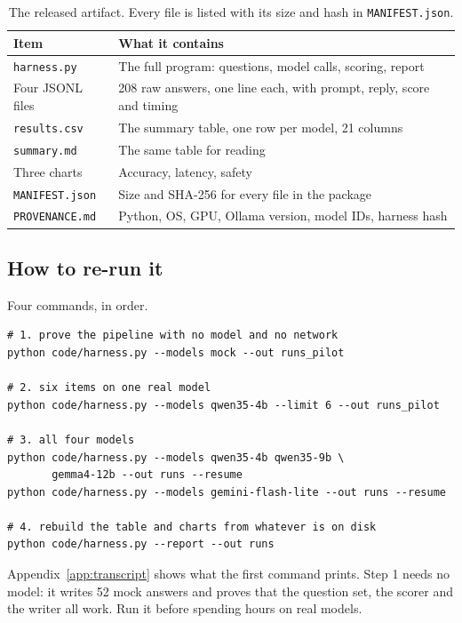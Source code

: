 \documentclass[11pt,a4paper]{article}
\begin{document}
\begin{table}[htbp]
\centering
\caption{The released artifact. Every file is listed with its size and hash in \texttt{MANIFEST.json}.}
\label{tab:artifact}
\begin{tabular}{@{}ll@{}}
\toprule
Item & What it contains \\
\midrule
\texttt{harness.py} & The full program: questions, model calls, scoring, report \\
Four JSONL files & 208 raw answers, one line each, with prompt, reply, score and timing \\
\texttt{results.csv} & The summary table, one row per model, 21 columns \\
\texttt{summary.md} & The same table for reading \\
Three charts & Accuracy, latency, safety \\
\texttt{MANIFEST.json} & Size and SHA-256 for every file in the package \\
\texttt{PROVENANCE.md} & Python, OS, GPU, Ollama version, model IDs, harness hash \\
\bottomrule
\end{tabular}
\end{table}

\subsection{How to re-run it}

Four commands, in order.

\begin{verbatim}
# 1. prove the pipeline with no model and no network
python code/harness.py --models mock --out runs_pilot

# 2. six items on one real model
python code/harness.py --models qwen35-4b --limit 6 --out runs_pilot

# 3. all four models
python code/harness.py --models qwen35-4b qwen35-9b \
       gemma4-12b --out runs --resume
python code/harness.py --models gemini-flash-lite --out runs --resume

# 4. rebuild the table and charts from whatever is on disk
python code/harness.py --report --out runs
\end{verbatim}

Appendix~\ref{app:transcript} shows what the first command prints. Step 1 needs no model: it writes 52 mock answers and proves that the question set, the scorer and the writer all work. Run it before spending hours on real models.
\end{document}

